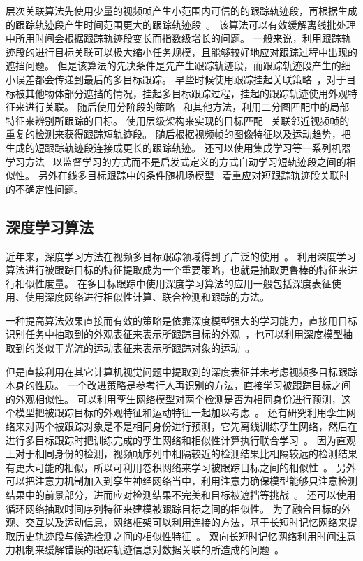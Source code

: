 层次关联算法先使用少量的视频帧产生小范围内可信的的跟踪轨迹段，再根据生成的跟踪轨迹段产生时间范围更大的跟踪轨迹段~\cite{mot_doc}。
该算法可以有效缓解离线批处理中所用时间会根据跟踪轨迹段变长而指数级增长的问题。
一般来说，利用跟踪轨迹段的进行目标关联可以极大缩小任务规模，且能够较好地应对跟踪过程中出现的遮挡问题。
但是该算法的先决条件是先产生跟踪轨迹段，而跟踪轨迹段产生的细小误差都会传递到最后的多目标跟踪。
早些时候使用跟踪挂起关联策略~\cite{kaucic2005a}，对于目标被其他物体部分遮挡的情况，挂起多目标跟踪过程，挂起的跟踪轨迹使用外观特征来进行关联。
随后使用分阶段的策略~\cite{wu2007detection} 和其他方法，利用二分图匹配中的局部特征来辨别所跟踪的目标。
使用层级架构来实现的目标匹配~\cite{huang2008robust} 关联邻近视频帧的重复的检测来获得跟踪短轨迹段。
随后根据视频帧的图像特征以及运动趋势，把生成的短跟踪轨迹段连接成更长的跟踪轨迹。
还可以使用集成学习等一系列机器学习方法~\cite{li2009learning} 以监督学习的方式而不是启发式定义的方式自动学习短轨迹段之间的相似性。
另外在线多目标跟踪中的条件随机场模型~\cite{condition_field,asrcf2} 着重应对短跟踪轨迹段关联时的不确定性问题。


\subsection{深度学习算法}
近年来，深度学习方法在视频多目标跟踪领域得到了广泛的使用~\cite{ke2021prototypical,baisa2021robust,hsu2022multi}。
利用深度学习算法进行被跟踪目标的特征提取成为一个重要策略，也就是抽取更鲁棒的特征来进行相似性度量。
在多目标跟踪中使用深度学习算法的应用一般包括深度表征使用、使用深度网络进行相似性计算、联合检测和跟踪的方法。

一种提高算法效果直接而有效的策略是依靠深度模型强大的学习能力，直接用目标识别任务中抽取到的外观表征来表示所跟踪目标的外观~\cite{kim2015multiple}，也可以利用深度模型抽取到的类似于光流的运动表征来表示所跟踪对象的运动~\cite{b18}。

但是直接利用在其它计算机视觉问题中提取到的深度表征并未考虑视频多目标跟踪本身的性质。
一个改进策略是参考行人再识别的方法，直接学习被跟踪目标之间的外观相似性。
可以利用孪生网络模型对两个检测是否为相同身份进行预测，这个模型把被跟踪目标的外观特征和运动特征一起加以考虑~\cite{RN454,twin_net}。
还有研究利用孪生网络来对两个被跟踪对象是不是相同身份进行预测，它先离线训练孪生网络，然后在进行多目标跟踪时把训练完成的孪生网络和相似性计算执行联合学习~\cite{wang2016joint}。
因为直观上对于相同身份的检测，视频帧序列中相隔较近的检测结果比相隔较远的检测结果有更大可能的相似，所以可利用卷积网络来学习被跟踪目标之间的相似性~\cite{b19}。
另外可以把注意力机制加入到孪生神经网络当中，利用注意力确保模型能够只注意检测结果中的前景部分，进而应对检测结果不完美和目标被遮挡等挑战~\cite{gm_phd}。
%
还可以使用循环网络抽取时间序列特征来建模被跟踪目标之间的相似性。
为了融合目标的外观、交互以及运动信息，网络框架可以利用连接的方法，基于长短时记忆网络来提取历史轨迹段与候选检测之间的相似性特征~\cite{b23}。
双向长短时记忆网络利用时间注意力机制来缓解错误的跟踪轨迹信息对数据关联的所造成的问题~\cite{dual_matching}。

